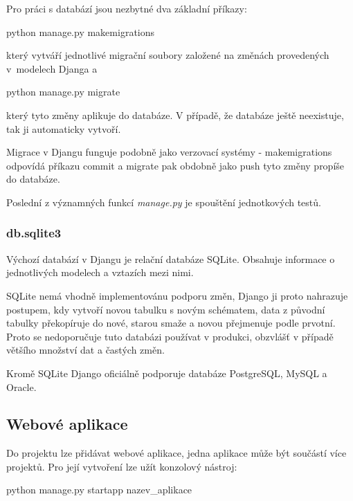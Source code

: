 Pro práci s databází jsou nezbytné dva základní příkazy:

\begin{center}
\textsf{python manage.py makemigrations}
\end{center}

který vytváří jednotlivé migrační soubory založené na změnách
provedených v~modelech Djanga a

\begin{center}
\textsf{python manage.py migrate}
\end{center}

který tyto změny aplikuje do databáze. V případě, že databáze ještě
neexistuje, tak ji automaticky vytvoří.

Migrace v Djangu funguje podobně jako verzovací systémy -
\textsf{makemigrations} odpovídá příkazu \textsf{commit} a
\textsf{migrate} pak obdobně jako \textsf{push} tyto změny propíše do
databáze.

Poslední z významných funkcí \textit{manage.py} je spouštění
jednotkových testů.

\subsubsection{db.sqlite3}
Výchozí databází v Djangu je relační databáze SQLite. Obsahuje
informace o jednotlivých modelech a vztazích mezi nimi.

SQLite nemá vhodně implementovánu podporu změn, Django ji proto
nahrazuje postupem, kdy vytvoří novou tabulku s novým schématem, data
z původní tabulky překopíruje do nové, starou smaže a novou přejmenuje
podle prvotní. Proto se nedoporučuje tuto databázi používat v
produkci, obzvlášť v případě většího množství dat a častých změn.

Kromě SQLite Django oficiálně podporuje databáze PostgreSQL, MySQL a
Oracle.

\subsection{Webové aplikace}
\label{django-app}
Do projektu lze přidávat webové aplikace, jedna aplikace může být
součástí více projektů. Pro její vytvoření lze užít konzolový nástroj:

\begin{center}
\textsf{python manage.py startapp nazev\_aplikace}
\end{center}


